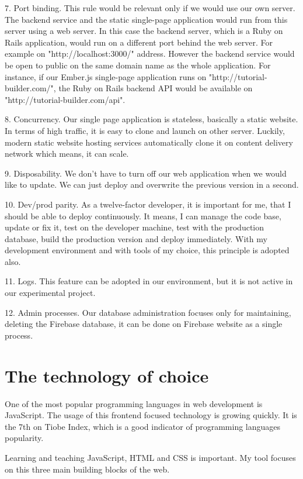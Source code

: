 \documentclass[11pt, a4paper, oneside, openright, medskipamount]{report}
\begin{document}
7. Port binding. This rule would be relevant only if we would use our own server. The backend service and the static single-page application would run from this server using a web server. In this case the backend server, which is a Ruby on Rails application, would run on a different port behind the web server. For example on "http://localhost:3000/" address. However the backend service would be open to public on the same domain name as the whole application. For instance, if our Ember.js single-page application runs on "http://tutorial-builder.com/", the Ruby on Rails backend API would be available on "http://tutorial-builder.com/api".

8. Concurrency. Our single page application is stateless, basically a static website. In terms of high traffic, it is easy to clone and launch on other server. Luckily, modern static website hosting services automatically clone it on content delivery network which means, it can scale.

9. Disposability. We don't have to turn off our web application when we would like to update. We can just deploy and overwrite the previous version in a second.

10. Dev/prod parity. As a twelve-factor developer, it is important for me, that I should be able to deploy continuously. It means, I can manage the code base, update or fix it, test on the developer machine, test with the production database, build the production version and deploy immediately. With my development environment and with tools of my choice, this principle is adopted also.

11. Logs. This feature can be adopted in our environment, but it is not active in our experimental project.

12. Admin processes. Our database administration focuses only for maintaining, deleting the Firebase database, it can be done on Firebase website as a single process.

\section{The technology of choice}

One of the most popular programming languages in web development is JavaScript. The usage of this frontend focused technology is growing quickly.  It is the 7th on Tiobe Index, which is a good indicator of programming languages popularity. \cite{tiobe}

Learning and teaching JavaScript, HTML and CSS is important. My tool focuses on this three main building blocks of the web.
\end{document}

